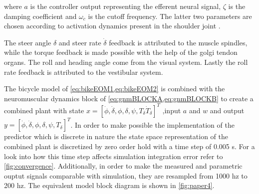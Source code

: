 where \ensuremath{a} is the controller output representing the efferent neural signal, \ensuremath{\zeta} is the damping coefficient and \ensuremath{\omega_c} is the cutoff frequency. The latter two   parameters are chosen according to activation dynamics present in the shoulder joint \cite{happee2008posture}.

The steer angle \(\delta\) and steer rate \(\dot{\delta}\) feedback is attributed to the muscle spindles, while the torque feedback is made possible with the help of the golgi tendon organs. The roll and heading angle come from the visual system. Lastly the roll rate feedback is attributed to the vestibular system. 

The bicycle model of \cref{eq:bikeEOM1,eq:bikeEOM2} is combined with the neuromuscular dynamics block of \cref{eq:gnmBLOCKA,eq:gnmBLOCKB} to create a combined  plant with state \ensuremath{x=[\dot{\phi}, \dot{\delta}, \phi, \delta, \psi, T_\delta \dot{T}_\delta]^{T}} ,input \ensuremath{a} and \ensuremath{w} and output \ensuremath{y=[\dot{\phi}, \dot{\delta}, \phi, \delta, \psi, T_\delta]^{T}}. In order to make possible the implementation of the predictor which is discrete in nature the state space representation of the combined plant is discretized by zero order hold with a time step of 0.005 \si{\second}. For a look into how this time step affects simulation integration error refer to \cref{fig:convergence}. Additionally, in order to make the measured  and parametric ouptut signals comparable with simulation, they are resampled from 1000 \si{hz} to 200 \si{hz}. The equivalent model block diagram is shown in \cref{fig:paper4}.

